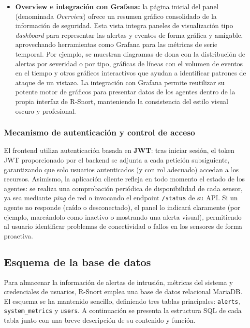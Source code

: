 \documentclass[11pt,a4paper,twoside]{report}
\begin{document}
\begin{itemize}
	\item \textbf{Overview e integración con Grafana:} la página inicial del panel (denominada \emph{Overview}) ofrece un resumen gráfico consolidado de la información de seguridad. Esta vista integra paneles de visualización tipo \emph{dashboard} para representar las alertas y eventos de forma gráfica y amigable, aprovechando herramientas como Grafana para las métricas de serie temporal. Por ejemplo, se muestran diagramas de dona con la distribución de alertas por severidad o por tipo, gráficas de líneas con el volumen de eventos en el tiempo y otros gráficos interactivos que ayudan a identificar patrones de ataque de un vistazo. La integración con Grafana permite reutilizar su potente motor de gráficos para presentar datos de los agentes dentro de la propia interfaz de R-Snort, manteniendo la consistencia del estilo visual oscuro y profesional.
\end{itemize}

\subsubsection{Mecanismo de autenticación y control de acceso}

El frontend utiliza autenticación basada en \textbf{JWT}: tras iniciar sesión, el token JWT proporcionado por el backend se adjunta a cada petición subsiguiente, garantizando que solo usuarios autenticados (y con rol adecuado) accedan a los recursos. Asimismo, la aplicación cliente refleja en todo momento el estado de los agentes: se realiza una comprobación periódica de disponibilidad de cada sensor, ya sea mediante \emph{ping} de red o invocando el endpoint \texttt{/status} de su API. Si un agente no responde (caído o desconectado), el panel lo indicará claramente (por ejemplo, marcándolo como inactivo o mostrando una alerta visual), permitiendo al usuario identificar problemas de conectividad o fallos en los sensores de forma proactiva.

\subsection{Esquema de la base de datos}

Para almacenar la información de alertas de intrusión, métricas del sistema y credenciales de usuarios, R-Snort emplea una base de datos relacional MariaDB. El esquema se ha mantenido sencillo, definiendo tres tablas principales: \texttt{alerts}, \texttt{system\_metrics} y \texttt{users}. A continuación se presenta la estructura SQL de cada tabla junto con una breve descripción de su contenido y función.\newline
\end{document}
